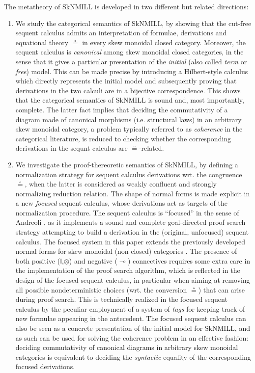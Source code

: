 \documentclass[submission,copyright,creativecommons]{eptcs}
\newcommand{\ot}{\otimes}
\newcommand{\lolli}{\multimap}
\newcommand{\I}{\mathsf{I}}
\begin{document}
The metatheory of SkNMILL is developed in two different but related directions:
\begin{enumerate}[($i$)]
  \item We study the categorical semantics of SkNMILL, by showing that the cut-free sequent calculus admits an interpretation of formulae, derivations and equational theory $\circeq$ in every skew monoidal closed category. Moreover, the sequent calculus is \emph{canonical} among skew monoidal closed categories, in the sense that it gives a particular presentation of the \emph{initial} (also called \emph{term} or \emph{free}) model. This can be made precise by introducing a Hilbert-style calculus which directly represents the initial model and subsequently proving that derivations in the two calculi are in a bijective correspondence.
This shows that the categorical semantics of SkNMILL is sound and, most importantly, complete. The latter fact implies that deciding the commutativity of a diagram made of canonical morphisms (i.e. structural laws) in an arbitrary skew monoidal category, a problem typically referred to as \emph{coherence} in the categorical literature, is reduced to checking whether the corresponding derivations in the sequnt calculus are $\circeq$-related.

\item We investigate the proof-thereoretic semantics of SkNMILL, by defining a normalization strategy for sequent calculus derivations wrt. the congruence $\circeq$, when the latter is considered as weakly confluent and strongly normalizing reduction relation. The shape of normal forms is made explicit in a new \emph{focused} sequent calculus, whose derivations act as targets of the normalization procedure. The sequent calculus is ``focused'' in the sense of Andreoli \cite{andreoli:logic:1992}, as it implements a sound and complete goal-directed proof search strategy attempting to build a derivation in the (original, unfocused) sequent calculus. The focused system in this paper extends the previously 
developed normal forms for skew monoidal (non-closed) categories \cite{uustalu:sequent:2018,uustalu:proof:nodate}. The presence of both positive ($\I$,$\ot$) and negative ($\lolli$) connectives requires some extra care in the implementation of the proof search algorithm, which is reflected in the design of the focused sequent calculus, in particular when aiming at removing all possible nondeterministic choices (wrt. the conversion $\circeq$) that can arise during proof search. This is technically realized in the focused sequent calculus by the peculiar employment of a system of \emph{tags} for keeping track of new formulae appearing in the antecedent. The focused sequent calculus can also be seen as a concrete presentation of the initial model for SkNMILL, and as such can be used for solving the coherence problem in an effective fashion: deciding commutativity of canonical diagrams in arbitrary skew monoidal categories is equivalent to deciding the \emph{syntactic} equality of the corresponding focused derivations.
\end{enumerate}
\end{document}
